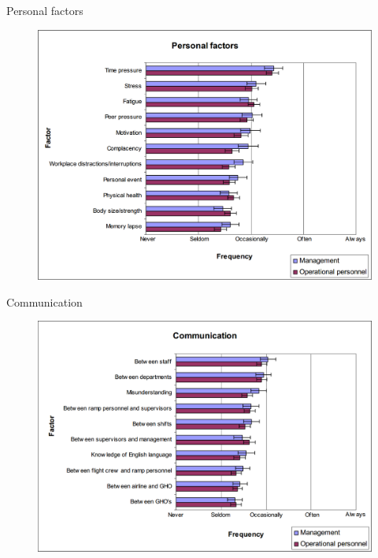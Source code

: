 \begin{frame}{Personal factors}{}
	\begin{figure}[H]
	\centering
	\includegraphics[width=\textwidth]{Grafik/PersonalFactors}
\end{figure}
\end{frame}

\begin{frame}{Communication}{}
	\begin{figure}[H]
	\centering
	\includegraphics[width=\textwidth]{Grafik/CommunicationalFactors}
\end{figure}
\end{frame}

